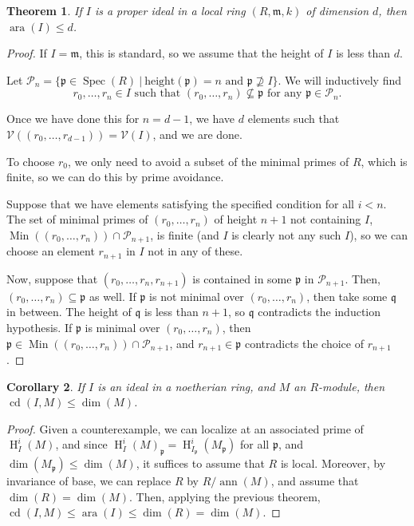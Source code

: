 \documentclass[11pt]{book}
\newtheorem{theorem}{Theorem}[chapter]
\newtheorem{corollary}[theorem]{Corollary}
\numberwithin{equation}{section}
\numberwithin{theorem}{chapter}
\theoremstyle{definition}
\newtheorem*{basic properties}{Basic Properties}
\newtheorem*{Important Remark}{Important Remark}
\theoremstyle{remark}
\newcommand{\m}{\mathfrak{m}}
\newcommand{\V}{\mathcal{V}}
\newcommand{\p}{\mathfrak{p}}
\newcommand{\q}{\mathfrak{q}}
\newcommand{\cP}{\mathcal{P}}
\newcommand{\ara}{\operatorname{ara}}
\newcommand{\Spec}{\operatorname{Spec}}
\newcommand{\ann}{\operatorname{ann}}
\newcommand{\Min}{\operatorname{Min}}
\DeclareMathOperator{\cd}{cd}
\renewcommand{\dim}{\operatorname{dim}}
\renewcommand{\H}{\operatorname{H}}
\begin{document}
\begin{theorem}
	If $I$ is a proper ideal in a local ring $(R,\m,k)$ of dimension $d$, then $\ara(I)\leq d$.
\end{theorem}
\begin{proof}
	If $I=\m$, this is standard, so we assume that the height of $I$ is less than $d$.
	
	Let $\cP_n=\{\p \in \Spec(R) \ | \ \mathrm{height}(\p)=n \text{ and } \p \not\supseteq I\}$. We will inductively find 
	\[r_0,\dots,r_n\in I \text{ such that } (r_0,\dots,r_n)\not\subseteq \p \text{ for any } \p\in \cP_n.\] 
	
	Once we have done this for $n=d-1$, we have $d$ elements such that $\V((r_0,\dots,r_{d-1}))=\V(I)$, and we are done.
	
	To choose $r_0$, we only need to avoid a subset of the minimal primes of $R$, which is finite, so we can do this by prime avoidance.
	
	Suppose that we have elements satisfying the specified condition for all $i<n$. The set of minimal primes of $(r_0,\dots,r_n)$ of height $n+1$ not containing $I$, $\Min((r_0,\dots,r_n)) \cap \cP_{n+1}$, is finite (and $I$ is clearly not any such $I$), so we can choose an element $r_{n+1}$ in $I$ not in any of these.
	
	Now, suppose that $(r_0,\dots,r_n,r_{n+1})$ is contained in some $\p$ in $\cP_{n+1}$. Then, $(r_0,\dots,r_n)\subseteq \p$ as well. If $\p$ is not minimal over $(r_0,\dots,r_n)$, then take some $\q$ in between. The height of $\q$ is less than $n+1$, so $\q$ contradicts the induction hypothesis. If $\p$ is minimal over $(r_0,\dots,r_n)$, then $\p\in \Min((r_0,\dots,r_n)) \cap \cP_{n+1}$, and $r_{n+1}\in \p$ contradicts the choice of $r_{n+1}$.
\end{proof}


\begin{corollary}
	If $I$ is an ideal in a noetherian ring, and $M$ an $R$-module, then $\cd(I,M)\leq \dim(M)$.
\end{corollary}
\begin{proof}
	Given a counterexample, we can localize at an associated prime of $\H^i_I(M)$, and since $\H^i_I(M)_\p=\H^i_{I_\p}(M_{\p})$ for all $\p$, and $\dim(M_\p)\leq \dim(M)$, it suffices to assume that $R$ is local. Moreover, by invariance of base, we can replace $R$ by $R/\ann(M)$, and assume that $\dim(R)=\dim(M)$. Then, applying the previous theorem, $\cd(I,M)\leq \ara(I)\leq \dim(R)=\dim(M)$.
\end{proof}
\end{document}

